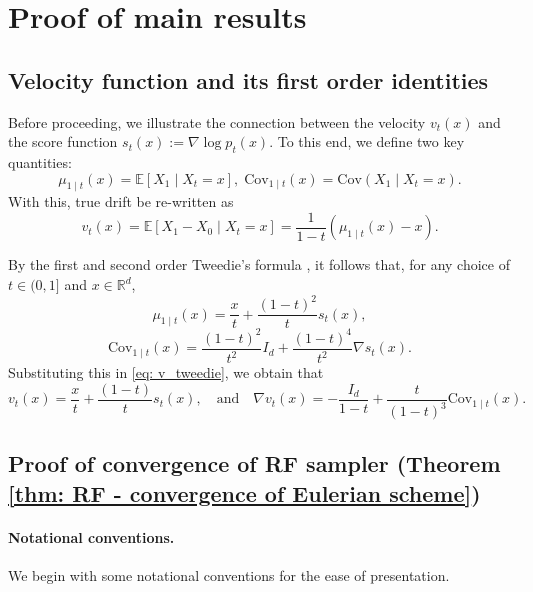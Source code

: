 \documentclass{article}
\theoremstyle{plain}
\theoremstyle{definition}
\theoremstyle{remark}
\def\bbE{\mathbb{E}}
\def\Cov{\text{Cov}}
\newcommand{\br}[1]{\left({#1}\right)}
\begin{document}
\newpage
\section{Proof of main results}
\label{app: proof of main results}



\subsection{Velocity function and its first order identities}
\label{app: v first order identities}
Before proceeding, we illustrate the connection between the velocity $v_t(x)$ and the score function $s_t(x):= \nabla \log p_t(x)$. 
 To this end, we define two key quantities:
\[
\mu_{1\mid t}(x) = \bbE[X_1 \mid X_t = x], 
\; 
\Cov_{1 \mid t}(x) = \Cov(X_1 \mid X_t = x).
\]
With this, true drift be re-written as
\begin{equation}
\label{eq: v_tweedie}
v_t(x) = \bbE[X_1 - X_0 \mid X_t = x] = \frac{1}{1-t}\br{\mu_{1 \mid t}(x) - x}.
\end{equation}

By the first and second order Tweedie's formula \citep{efron2011tweedie, meng2021estimating}, it follows that, for any choice of $t \in (0,1]$ and $x \in \mathbb{R}^d$,
\[
\mu_{1 \mid t}(x) =   \frac{x}{t} + \frac{(1-t)^2}{t} s_t(x),\] 
\[
\Cov_{1 \mid t}(x) = \frac{(1-t)^2}{t^2}I_d + \frac{(1-t)^4}{t^2} \nabla s_t(x).
\]
Substituting this in \eqref{eq: v_tweedie}, we obtain that 
$$
v_t(x) = \frac{x}{t} + \frac{(1-t)}{t} s_t(x), \quad  \text{and} \quad \nabla v_t(x) = - \frac{I_d}{1-t} + \frac{t}{(1-t)^3} \Cov_{1 \mid t}(x).
$$

\subsection{Proof of convergence of RF sampler (Theorem \ref{thm: RF - convergence of Eulerian scheme})}
\label{app: RF convergence}
\paragraph{Notational conventions.}
We begin with some notational conventions for the ease of presentation. 
\end{document}
